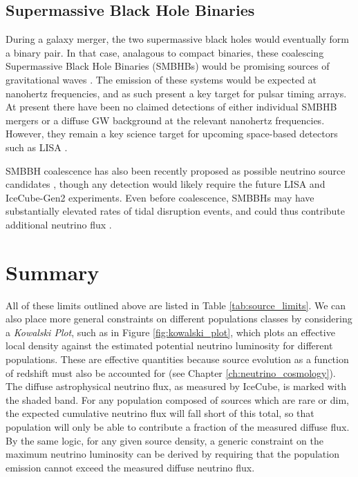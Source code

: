 \subsection*{Supermassive Black Hole Binaries}

During a galaxy merger, the two supermassive black holes would eventually form a binary pair. In that case, analagous to compact binaries, these coalescing Supermassive Black Hole Binaries (SMBHBs) would be promising sources of gravitational waves  . The emission of these systems would be expected at nanohertz frequencies, and as such present a key target for pulsar timing arrays. At present there have been no claimed detections of either individual SMBHB mergers or a diffuse GW background at the relevant nanohertz frequencies. However, they remain a key science target for upcoming space-based detectors such as LISA .

SMBBH coalescence has also been recently proposed as possible neutrino source candidates , though any detection would likely require the future LISA and IceCube-Gen2 experiments. Even before coalescence, SMBBHs may have substantially elevated rates of tidal disruption events, and could thus contribute additional neutrino flux . 

\section{Summary}

All of these limits outlined above are listed in Table \ref{tab:source_limits}. We can also place more general constraints on different populations classes by considering a \emph{Kowalski Plot}, such as in Figure \ref{fig:kowalski_plot}, which plots an effective local density against the estimated potential neutrino luminosity for different populations. These are effective quantities because source evolution as a function of redshift must also be accounted for (see Chapter \ref{ch:neutrino_cosmology}). The diffuse astrophysical neutrino flux, as measured by IceCube, is marked with the shaded band. For any population composed of sources which are rare or dim, the expected cumulative neutrino flux will fall short of this total, so that population will only be able to contribute a fraction of the measured diffuse flux. By the same logic, for any given source density, a generic constraint on the maximum neutrino luminosity can be derived by requiring that the population emission cannot exceed the measured diffuse neutrino flux.

